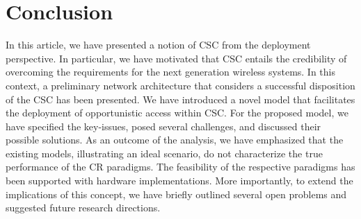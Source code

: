 \documentclass[draftcls, onecolumn, 11pt]{IEEEtran}
\begin{document}
\section{Conclusion} \label{sec:conc}

In this article, we have presented a notion of CSC from the deployment perspective. In particular, we have motivated that CSC entails the credibility of overcoming the requirements for the next generation wireless systems. In this context, a preliminary network architecture that considers a successful disposition of the CSC has been presented. We have introduced a novel model that facilitates the deployment of opportunistic access within CSC. For the proposed model, we have specified the key-issues, posed several challenges, and discussed their possible solutions. As an outcome of the analysis, we have emphasized that the existing models, illustrating an ideal scenario, do not characterize the true performance of the CR paradigms. The feasibility of the respective paradigms has been supported with hardware implementations. More importantly, to extend the implications of this concept, we have briefly outlined several open problems and suggested future research directions.     
\end{document}

